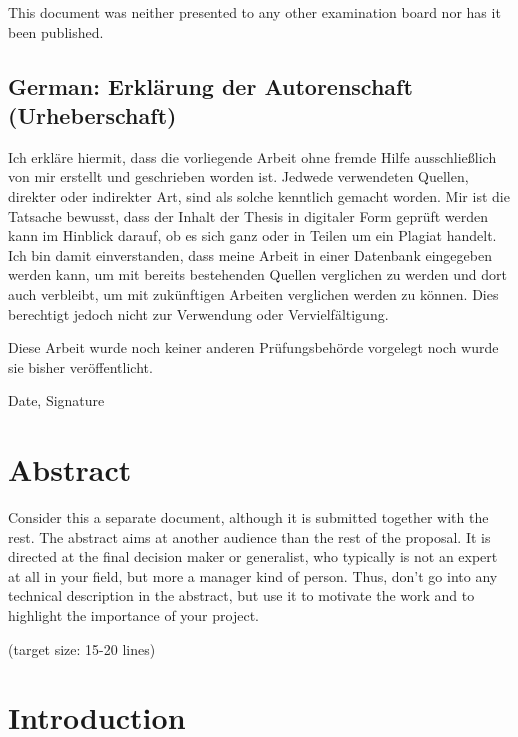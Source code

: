 \documentclass[a4paper, 11pt, oneside]{article}
\begin{document}
  This document was neither presented to any other examination board
  nor has it been published.

  \subsection*{German: Erklärung der Autorenschaft (Urheberschaft)}

  Ich erkläre hiermit, dass die vorliegende Arbeit ohne fremde Hilfe
  ausschließlich von mir erstellt und geschrieben worden ist. Jedwede
  verwendeten Quellen, direkter oder indirekter Art, sind als solche
  kenntlich gemacht worden. Mir ist die Tatsache bewusst, dass der
  Inhalt der Thesis in digitaler Form geprüft werden kann im Hinblick
  darauf, ob es sich ganz oder in Teilen um ein Plagiat handelt. Ich
  bin damit einverstanden, dass meine Arbeit in einer Datenbank
  eingegeben werden kann, um mit bereits bestehenden Quellen
  verglichen zu werden und dort auch verbleibt, um mit zukünftigen
  Arbeiten verglichen werden zu können. Dies berechtigt jedoch nicht
  zur Verwendung oder Vervielfältigung.

  Diese Arbeit wurde noch keiner anderen Prüfungsbehörde vorgelegt
  noch wurde sie bisher veröffentlicht.

  \vspace{20mm}

  Date, Signature

  \newpage

  \section*{Abstract}

  Consider this a separate document, although it is submitted together
  with the rest. The abstract aims at another audience than the rest
  of the proposal. It is directed at the final decision maker or
  generalist, who typically is not an expert at all in your field, but
  more a manager kind of person. Thus, don't go into any technical
  description in the abstract, but use it to motivate the work and to
  highlight the importance of your project.

  (target size: 15-20 lines)

  \newpage
  \tableofcontents

  \clearpage

  \section{Introduction}
\end{document}
